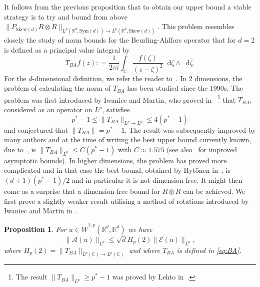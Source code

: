 \documentclass[11pt, a4paper]{amsart}
\newtheorem{proposition}{Proposition}[section]
\theoremstyle{definition}
\theoremstyle{remark}
\newcommand{\R}{\mathbb{R}}
\newcommand{\C}{\mathbb{C}}
\newcommand*\diff{\mathop{}\!\mathrm{d}}
\begin{document}
It follows from the previous 
proposition that to 
obtain our upper bound a viable strategy is to try
and bound from above $\|P_{\mathrm{Skew}(d)}R\otimes R\|_{
L^p(\mathbb R^d, \mathrm{Sym}(d))
\to L^p(\R^d, \mathrm{Skew}(d))}.$
This problem resembles closely the study
of norm bounds for the Beurling-Ahlfors operator
that for $d=2$ is defined as a
principal value integral by
\begin{equation}
    \label{eq:BA}
T_{BA}f(z)\mathrel{:}=\frac1{2\pi i}\int_{\C}
\frac{f(\zeta)}{(z-\zeta)^2}\diff \zeta
\wedge \diff \bar \zeta.
\end{equation}
For the $d$-dimensional definition,
we refer the reader to~\cite{IM}. 
In $2$ dimensions, the problem of calculating
the norm of $T_{BA}$ has been studied since the 1990s.
The problem was first introduced by Iwaniec and 
Martin, who proved in~\cite{IM}
\footnote{The result $\|T_{BA}\|_{L^p}\ge p^*-1$
was proved by Lehto in~\cite{Lehto_1966}.} that
$T_{BA}$, considered as an operator on $L^p$, 
satisfies
\begin{equation*}
p^*-1\le \|T_{BA}\|_{L^p\to L^p}\le 4 (p^*-1)
\end{equation*}
and conjectured that $\|T_{BA}\|=p^*-1$.
The result was subsequently improved by many authors
and at the time of writing
the best upper bound
currently known,
due to~\cite{Banuelos2008}, is 
$\|T_{BA}\|_{L^p}\le C (p^*-1)$
with $C\approx 1.575$
(see also~\cite{Volberg} 
for improved asymptotic bounds).
In higher dimensions, the problem has proved
more complicated and in that case the best bound,
obtained by Hytönen in~\cite{Hytonen},
is $(d+1)(p^*-1)/2$ and
in particular it is not dimension-free.
It might then come as a surprise that
a dimension-free bound for $R\otimes R$
can be achieved. We first
prove a slightly weaker result utilising
a method of rotations introduced by 
Iwaniec and Martin in \cite{IM}.
\begin{proposition}
\label{prop:rotationbound}
For $u\in \dot W^{1,p}(\R^d,\R^d)$
we have
\begin{equation}
\|\mathcal A(u)\|_{L^p}\le 
\sqrt d H_p(2)\|\mathcal E(u)\|_{L^p},
\end{equation}
where $H_p(2)=\|T_{BA}\|_{L^p(\C)\to L^p(\C)}$
and where $T_{BA}$ is defined in \eqref{eq:BA}.
\end{proposition}
\end{document}

